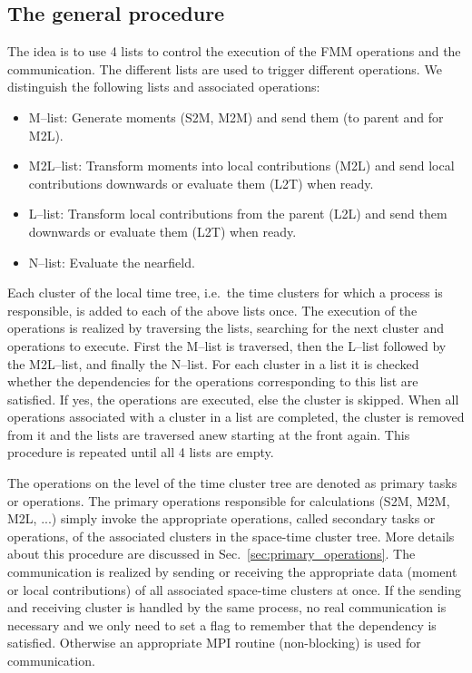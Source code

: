\documentclass[a4paper,11pt]{article}
\theoremstyle{plain}
\theoremstyle{definition}
\theoremstyle{remark}
\begin{document}
\subsection{The general procedure} \label{sec:fmm_general_procedure}
The idea is to use 4 lists to control the execution of the FMM operations and the communication. The different lists are used to trigger different operations. We distinguish the following lists and associated operations:
\begin{itemize}
  \item M--list: Generate moments (S2M, M2M) and send them (to parent and for M2L).
  \item M2L--list: Transform moments into local contributions (M2L) and send local contributions downwards or evaluate them (L2T) when ready.
  \item L--list: Transform local contributions from the parent (L2L) and send them downwards or evaluate them (L2T) when ready.
  \item N--list: Evaluate the nearfield.
\end{itemize}
Each cluster of the local time tree, i.e.~the time clusters for which a process is responsible, is added to each of the above lists once. The execution of the operations is realized by traversing the lists, searching for the next cluster and operations to execute. First the M--list is traversed, then the L--list followed by the M2L--list, and finally the N--list. For each cluster in a list it is checked whether the dependencies for the operations corresponding to this list are satisfied. If yes, the operations are executed, else the cluster is skipped. When all operations associated with a cluster in a list are completed, the cluster is removed from it and the lists are traversed anew starting at the front again. This procedure is repeated until all 4 lists are empty.

The operations on the level of the time cluster tree are denoted as primary tasks or operations. The primary operations responsible for calculations (S2M, M2M, M2L, ...) simply invoke the appropriate operations, called secondary tasks or operations, of the associated clusters in the space-time cluster tree. More details about this procedure are discussed in Sec.~\ref{sec:primary_operations}. The communication is realized by sending or receiving the appropriate data (moment or local contributions) of all associated space-time clusters at once. If the sending and receiving cluster is handled by the same process, no real communication is necessary and we only need to set a flag to remember that the dependency is satisfied. Otherwise an appropriate MPI routine (non-blocking) is used for communication.
\end{document}
